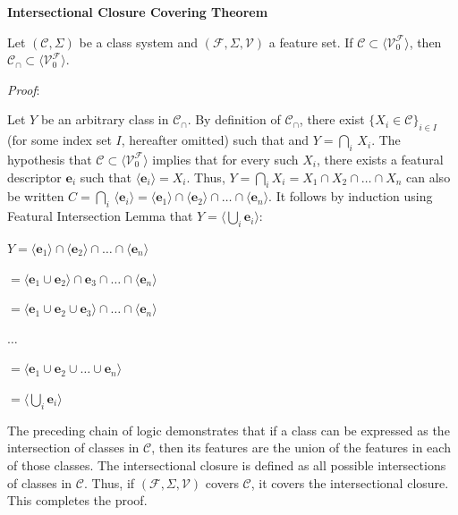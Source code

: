 \documentclass[11pt, oneside]{article}   	%
\begin{document}
\vspace{\baselineskip} \noindent \textbf{Intersectional Closure Covering Theorem}

Let $(\mathcal C, \Sigma)$ be a class system and $(\mathcal F, \Sigma, \mathcal V)$ a feature set. If $\mathcal C \subset \langle \mathcal V_0^\mathcal F \rangle$, then $\mathcal C_\cap \subset\langle \mathcal V_0^\mathcal F \rangle $.

\vspace{\baselineskip} \noindent \textit{Proof}:

Let $Y$ be an arbitrary class in $\mathcal C_\cap$. By definition of $\mathcal C_\cap$, there exist $\{X_i \in \mathcal C\}_{i \in I}$ (for some index set $I$, hereafter omitted) such that and $Y = \bigcap_i \, X_i$. The hypothesis that $\mathcal C \subset \langle \mathcal V_0^\mathcal F \rangle $ implies that for every such $X_i$, there exists a featural descriptor $\mathbf{e}_i$ such that $\langle \mathbf{e}_i \rangle = X_i$. Thus, $Y = \bigcap_i X_i = X_1 \cap X_2 \cap \ldots \cap X_n$ can also be written $C = \bigcap_i \, \langle \mathbf{e}_i \rangle = \langle \mathbf{e}_1 \rangle \cap \langle \mathbf{e}_2 \rangle \cap \ldots \cap \langle \mathbf{e}_n \rangle$. It follows by induction using Featural Intersection Lemma that $Y = \langle \bigcup_i \mathbf{e}_i \rangle$:

$Y = \langle \mathbf{e}_1 \rangle \cap  \langle \mathbf{e}_2 \rangle \cap \ldots \cap  \langle \mathbf{e}_n \rangle$

\quad $ = \langle \mathbf{e}_1 \cup \mathbf{e}_2 \rangle \cap \mathbf{e}_3 \cap \ldots \cap \langle \mathbf{e}_n \rangle$

\quad $ = \langle \mathbf{e}_1 \cup \mathbf{e}_2 \cup \mathbf{e}_3 \rangle \cap \ldots \cap \langle \mathbf{e}_n \rangle$

\quad $\ldots$

\quad $= \langle \mathbf{e}_1 \cup \mathbf{e}_2 \cup \ldots \cup \mathbf{e}_n \rangle$

\quad $= \langle \bigcup_i  \mathbf{e}_i \rangle$

\vspace{\baselineskip} \noindent The preceding chain of logic demonstrates that if a class can be expressed as the intersection of classes in $\mathcal C$, then its features are the union of the features in each of those classes. The intersectional closure is defined as all possible intersections of classes in $\mathcal C$. Thus, if $(\mathcal F, \Sigma, \mathcal V)$ covers $\mathcal C$, it covers the intersectional closure. This completes the proof.
\end{document}

